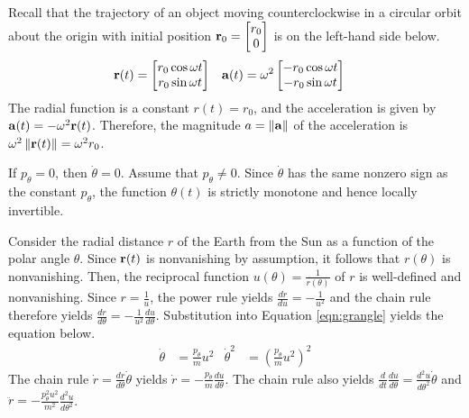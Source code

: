 \begin{answer}
	Recall that the trajectory of an object moving counterclockwise in a circular orbit about the origin with initial position $\mathbf{r}_0 = \begin{bmatrix} r_0 \\ 0 \end{bmatrix}$ is on the left-hand side below.
	\begin{align}
		\mathbf{r}(t) & =
		\begin{bmatrix}
			r_0 \cos \omega t \\
			r_0 \sin \omega t
		\end{bmatrix}
		       &
		\mathbf{a}(t) & =
		\omega^2
		\begin{bmatrix}
			- r_0 \cos \omega t \\
			- r_0 \sin \omega t
		\end{bmatrix}
	\end{align}
	The radial function is a constant $r(t) = r_0$, and the acceleration is given by $\mathbf{a}(t) = - \omega^2 \mathbf{r}(t)$.
	Therefore, the magnitude $a = \left\|\mathbf{a}\right\|$ of the acceleration is $\omega^2 \left\|\mathbf{r}(t)\right\| = \omega^2 r_0$.
\end{answer}

If $p_\theta = 0$, then $\dot{\theta} = 0$.
Assume that $p_\theta \neq 0$.
Since $\dot{\theta}$ has the same nonzero sign as the constant $p_\theta$, the function $\theta(t)$ is strictly monotone and hence locally invertible.

Consider the radial distance $r$ of the Earth from the Sun as a function of the polar angle $\theta$.
Since $\mathbf{r}(t)$ is nonvanishing by assumption, it follows that $r(\theta)$ is nonvanishing.
Then, the reciprocal function $u(\theta) = \frac{1}{r(\theta)}$ of $r$ is well-defined and nonvanishing.
Since $r = \frac{1}{u}$, the power rule yields $\frac{d r}{d u} = - \frac{1}{u^2}$ and the chain rule therefore yields $\frac{d r}{d \theta} = - \frac{1}{u^2} \frac{d u}{d \theta}$.
Substitution into Equation \eqref{eqn:grangle} yields the equation below.
\begin{align*}
	\dot{\theta}   & = \frac{p_\theta}{m} u^2
	               &
	\dot{\theta}^2 & = \left(\frac{p_\theta}{m} u^2\right)^2
\end{align*}
The chain rule $\dot{r} = \frac{d r}{d\theta} \dot{\theta}$ yields $\dot{r} = - \frac{p_\theta}{m} \frac{d u}{d \theta}$.
The chain rule also yields $\frac{d}{dt} \frac{du}{d\theta} = \frac{d^2u}{d\theta^2} \dot{\theta}$ and $\ddot{r} = - \frac{p_\theta^2 u^2}{m^2} \frac{d^2u}{d\theta^2}$.

